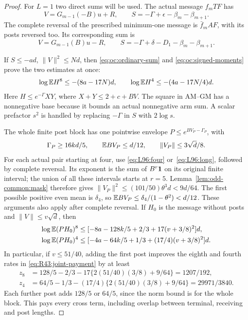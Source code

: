 \begin{proof}
For \(L=1\) two direct sums will be used. The actual message
\(f_mTF\) has
\begin{equation}\label{eq:R43:first-positive}
 V=G_{m-1}(-B)u+R,\qquad
 S=-\Gamma+\epsilon-\beta_m-\beta_{m+1}.
\end{equation}
The complete reversal of the prescribed minimum-one message is
\(\bar f_mAF\), with its posts reversed too. Its corresponding sum is
\begin{equation}\label{eq:R43:first-reversed}
 V=G_{m-1}(B)u-R,\qquad
 S=-\Gamma+\delta-D_1-\beta_m-\beta_{m+1}.
\end{equation}

If \(S\le-ad\), \(\|V\|^2\le Nd\), then
\eqref{eq:oc:ordinary-sum} and \eqref{eq:oc:signed-moments} prove
the two estimates at once:
\begin{equation}\label{eq:R43:joint-payment}
 \log\mathbb E H^8\le-(8a-17N)d,\qquad
 \log\mathbb E H^4\le-(4a-17N/4)d.
\end{equation}
Here \(H\le e^{-\Gamma}XY\), where \(X+Y\le2+c+BV\).
The square in AM--GM has a nonnegative base because it bounds an
actual nonnegative arm sum. A scalar prefactor \(s^2\) is handled by
replacing \(-\Gamma\) in \(S\) with \(2\log s\).

The whole finite post block has one pointwise envelope
\(P\le e^{BV_P-\Gamma_P}\), with
\[
 \Gamma_P\ge16kd/5,\qquad
 \mathbb E BV_P\le d/12,\qquad \|V_P\|\le3\sqrt d/8.
\]
For each actual pair starting at four, use
\eqref{eq:L96:four} or~\eqref{eq:L96:long}, followed by complete
reversal. Its exponent is the sum of \(B^r\mathbf1\) on its original
finite interval; the union of all these intervals starts at \(r=5\).
Lemma~\ref{lem:odd-common:mask} therefore gives
\(\|V_P\|^2\le(101/50)\theta^3d<9d/64\).
The first possible positive even mean is \(\delta_4\), so
\(\mathbb E BV_P\le\delta_4/(1-\theta^2)<d/12\).
These arguments also apply after complete reversal. If \(H_0\) is
the message without posts and \(\|V\|\le v\sqrt d\), then
\begin{equation}\label{eq:R43:post-payment}
\begin{aligned}
 \log\mathbb E(PH_0)^8&\le[-8a-128k/5+2/3+17(v+3/8)^2]d,\\
 \log\mathbb E(PH_0)^4&\le[-4a-64k/5+1/3+(17/4)(v+3/8)^2]d.
\end{aligned}
\end{equation}
In particular, if \(v\le51/40\), adding the first post
improves the eighth and fourth rates in
\eqref{eq:R43:joint-payment} by at least
\begin{equation}\label{eq:R43:post-gain}
 \begin{aligned}
 z_8&=128/5-2/3-17\{2(51/40)(3/8)+9/64\}=1207/192,\\
 z_4&=64/5-1/3-(17/4)\{2(51/40)(3/8)+9/64\}=29971/3840.
 \end{aligned}
\end{equation}
Each further post adds \(128/5\) or \(64/5\), since the norm bound
is for the whole block. This pays every cross term, including overlap
between terminal, receiving and post lengths.


\end{proof}
